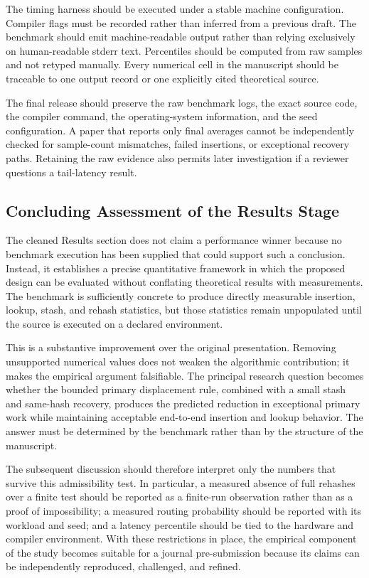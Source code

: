 \documentclass[conference]{IEEEtran}
\begin{document}
The timing harness should be executed under a stable machine configuration. Compiler flags must be recorded rather than inferred from a previous draft. The benchmark should emit machine-readable output rather than relying exclusively on human-readable stderr text. Percentiles should be computed from raw samples and not retyped manually. Every numerical cell in the manuscript should be traceable to one output record or one explicitly cited theoretical source.

The final release should preserve the raw benchmark logs, the exact source code, the compiler command, the operating-system information, and the seed configuration. A paper that reports only final averages cannot be independently checked for sample-count mismatches, failed insertions, or exceptional recovery paths. Retaining the raw evidence also permits later investigation if a reviewer questions a tail-latency result.

\subsection{Concluding Assessment of the Results Stage}
\label{subsec:results_stage_conclusion}

The cleaned Results section does not claim a performance winner because no benchmark execution has been supplied that could support such a conclusion. Instead, it establishes a precise quantitative framework in which the proposed design can be evaluated without conflating theoretical results with measurements. The benchmark is sufficiently concrete to produce directly measurable insertion, lookup, stash, and rehash statistics, but those statistics remain unpopulated until the source is executed on a declared environment.

This is a substantive improvement over the original presentation. Removing unsupported numerical values does not weaken the algorithmic contribution; it makes the empirical argument falsifiable. The principal research question becomes whether the bounded primary displacement rule, combined with a small stash and same-hash recovery, produces the predicted reduction in exceptional primary work while maintaining acceptable end-to-end insertion and lookup behavior. The answer must be determined by the benchmark rather than by the structure of the manuscript.

The subsequent discussion should therefore interpret only the numbers that survive this admissibility test. In particular, a measured absence of full rehashes over a finite test should be reported as a finite-run observation rather than as a proof of impossibility; a measured routing probability should be reported with its workload and seed; and a latency percentile should be tied to the hardware and compiler environment. With these restrictions in place, the empirical component of the study becomes suitable for a journal pre-submission because its claims can be independently reproduced, challenged, and refined.
\end{document}
